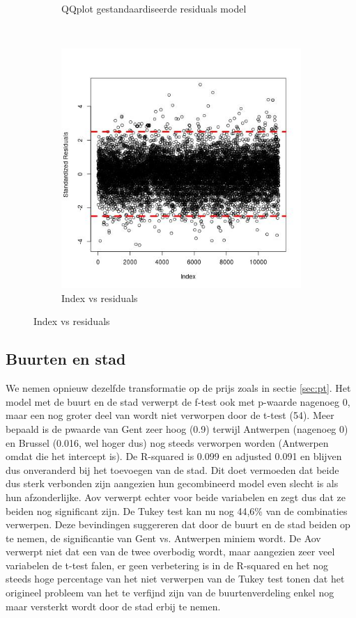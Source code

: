 \documentclass[a4paper,kulak]{kulakarticle} %
\begin{document}
\begin{figure}[H]
\begin{subfigure}[b]{0.3\textwidth}
		\caption{QQplot gestandaardiseerde residuals model}
		\label{fig:qqne}
	\end{subfigure}
	~
	\begin{subfigure}[b]{0.3\textwidth}
		\includegraphics[width=\textwidth]{stdne.jpg}
		\caption{Index vs residuals}
		\label{fig:stdne}
	\end{subfigure}
\end{figure}

\subsection{Buurten en stad}
We nemen opnieuw dezelfde transformatie op de prijs zoals in sectie \ref{sec:pt}.
Het model met de buurt en de stad verwerpt de f-test ook met p-waarde nagenoeg 0, maar een nog groter deel van  wordt niet verworpen door de t-test (54). Meer bepaald is de pwaarde van Gent zeer hoog (0.9) terwijl Antwerpen (nagenoeg 0) en Brussel (0.016, wel hoger dus) nog steeds verworpen worden (Antwerpen omdat die het intercept is). 
De R-squared is 0.099 en adjusted 0.091 en blijven dus onveranderd bij het toevoegen van de stad. Dit doet vermoeden dat beide dus sterk verbonden zijn aangezien hun gecombineerd model even slecht is als hun afzonderlijke.
Aov verwerpt echter voor beide variabelen en zegt dus dat ze beiden nog significant zijn.
De Tukey test kan nu nog 44,6\% van de combinaties verwerpen.
Deze bevindingen suggereren dat door de buurt en de stad beiden op te nemen, de significantie van Gent vs. Antwerpen miniem wordt. De Aov verwerpt niet dat een van de twee overbodig wordt, maar aangezien zeer veel variabelen de t-test falen, er geen verbetering is in de R-squared en het nog steeds hoge percentage van het niet verwerpen van de Tukey test tonen dat het origineel probleem van het te verfijnd zijn van de buurtenverdeling enkel nog maar versterkt wordt door de stad erbij te nemen.
\end{document}
